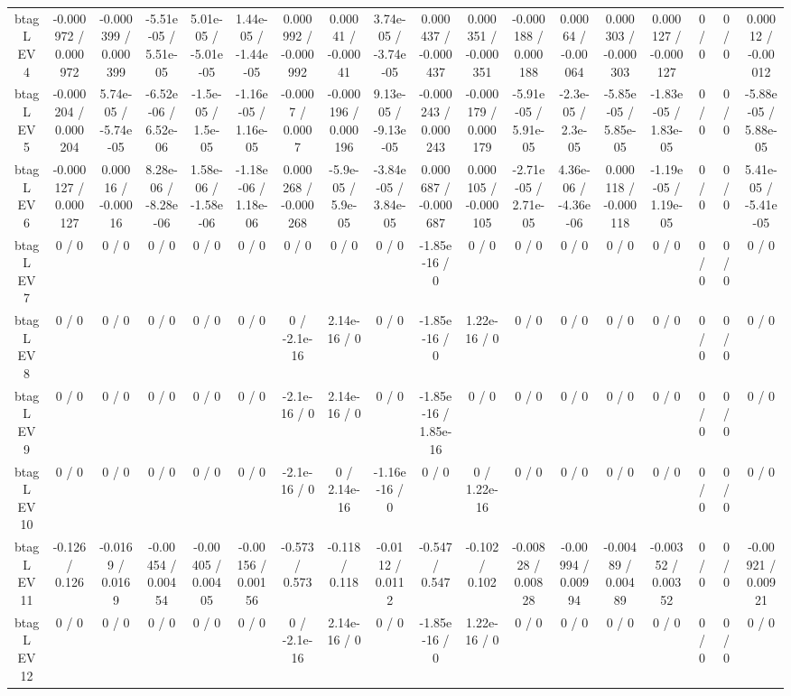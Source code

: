 \documentclass[10pt]{article}
\begin{document}
\begin{table}[htbp]
\begin{center}
\begin{tabular}{|c|c|c|c|c|c|c|c|c|c|c|c|c|c|c|c|c|c|}
  btag L EV 4 & -0.000972 / 0.000972 & -0.000399 / 0.000399 & -5.51e-05 / 5.51e-05 & 5.01e-05 / -5.01e-05 & 1.44e-05 / -1.44e-05 & 0.000992 / -0.000992 & 0.00041 / -0.00041 & 3.74e-05 / -3.74e-05 & 0.000437 / -0.000437 & 0.000351 / -0.000351 & -0.000188 / 0.000188 & 0.00064 / -0.00064 & 0.000303 / -0.000303 & 0.000127 / -0.000127 & 0 / 0 & 0 / 0 & 0.00012 / -0.00012 \\ 
  btag L EV 5 & -0.000204 / 0.000204 & 5.74e-05 / -5.74e-05 & -6.52e-06 / 6.52e-06 & -1.5e-05 / 1.5e-05 & -1.16e-05 / 1.16e-05 & -0.0007 / 0.0007 & -0.000196 / 0.000196 & 9.13e-05 / -9.13e-05 & -0.000243 / 0.000243 & -0.000179 / 0.000179 & -5.91e-05 / 5.91e-05 & -2.3e-05 / 2.3e-05 & -5.85e-05 / 5.85e-05 & -1.83e-05 / 1.83e-05 & 0 / 0 & 0 / 0 & -5.88e-05 / 5.88e-05 \\ 
  btag L EV 6 & -0.000127 / 0.000127 & 0.00016 / -0.00016 & 8.28e-06 / -8.28e-06 & 1.58e-06 / -1.58e-06 & -1.18e-06 / 1.18e-06 & 0.000268 / -0.000268 & -5.9e-05 / 5.9e-05 & -3.84e-05 / 3.84e-05 & 0.000687 / -0.000687 & 0.000105 / -0.000105 & -2.71e-05 / 2.71e-05 & 4.36e-06 / -4.36e-06 & 0.000118 / -0.000118 & -1.19e-05 / 1.19e-05 & 0 / 0 & 0 / 0 & 5.41e-05 / -5.41e-05 \\ 
  btag L EV 7 & 0 / 0 & 0 / 0 & 0 / 0 & 0 / 0 & 0 / 0 & 0 / 0 & 0 / 0 & 0 / 0 & -1.85e-16 / 0 & 0 / 0 & 0 / 0 & 0 / 0 & 0 / 0 & 0 / 0 & 0 / 0 & 0 / 0 & 0 / 0 \\ 
  btag L EV 8 & 0 / 0 & 0 / 0 & 0 / 0 & 0 / 0 & 0 / 0 & 0 / -2.1e-16 & 2.14e-16 / 0 & 0 / 0 & -1.85e-16 / 0 & 1.22e-16 / 0 & 0 / 0 & 0 / 0 & 0 / 0 & 0 / 0 & 0 / 0 & 0 / 0 & 0 / 0 \\ 
  btag L EV 9 & 0 / 0 & 0 / 0 & 0 / 0 & 0 / 0 & 0 / 0 & -2.1e-16 / 0 & 2.14e-16 / 0 & 0 / 0 & -1.85e-16 / 1.85e-16 & 0 / 0 & 0 / 0 & 0 / 0 & 0 / 0 & 0 / 0 & 0 / 0 & 0 / 0 & 0 / 0 \\ 
  btag L EV 10 & 0 / 0 & 0 / 0 & 0 / 0 & 0 / 0 & 0 / 0 & -2.1e-16 / 0 & 0 / 2.14e-16 & -1.16e-16 / 0 & 0 / 0 & 0 / 1.22e-16 & 0 / 0 & 0 / 0 & 0 / 0 & 0 / 0 & 0 / 0 & 0 / 0 & 0 / 0 \\ 
  btag L EV 11 & -0.126 / 0.126 & -0.0169 / 0.0169 & -0.00454 / 0.00454 & -0.00405 / 0.00405 & -0.00156 / 0.00156 & -0.573 / 0.573 & -0.118 / 0.118 & -0.0112 / 0.0112 & -0.547 / 0.547 & -0.102 / 0.102 & -0.00828 / 0.00828 & -0.00994 / 0.00994 & -0.00489 / 0.00489 & -0.00352 / 0.00352 & 0 / 0 & 0 / 0 & -0.00921 / 0.00921 \\ 
  btag L EV 12 & 0 / 0 & 0 / 0 & 0 / 0 & 0 / 0 & 0 / 0 & 0 / -2.1e-16 & 2.14e-16 / 0 & 0 / 0 & -1.85e-16 / 0 & 1.22e-16 / 0 & 0 / 0 & 0 / 0 & 0 / 0 & 0 / 0 & 0 / 0 & 0 / 0 & 0 / 0 \\ 

\end{tabular}
\end{center}
\end{table}
\end{document}
